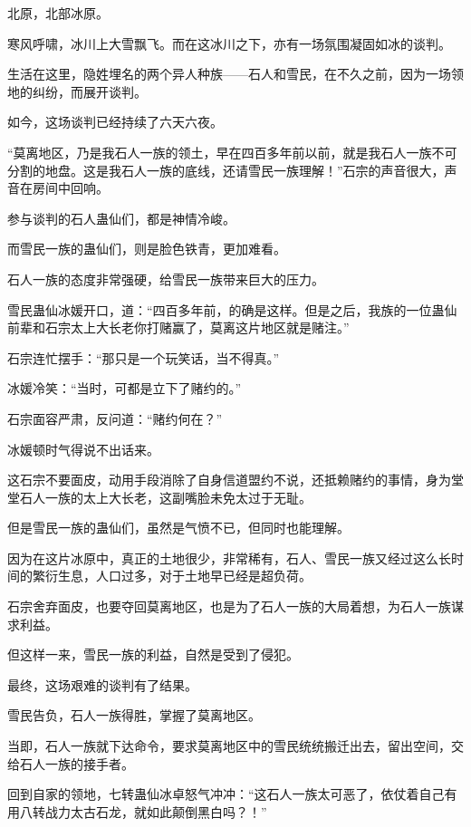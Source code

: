 
\begin{this_body}



北原，北部冰原。

寒风呼啸，冰川上大雪飘飞。而在这冰川之下，亦有一场氛围凝固如冰的谈判。

生活在这里，隐姓埋名的两个异人种族——石人和雪民，在不久之前，因为一场领地的纠纷，而展开谈判。

如今，这场谈判已经持续了六天六夜。

“莫离地区，乃是我石人一族的领土，早在四百多年前以前，就是我石人一族不可分割的地盘。这是我石人一族的底线，还请雪民一族理解！”石宗的声音很大，声音在房间中回响。

参与谈判的石人蛊仙们，都是神情冷峻。

而雪民一族的蛊仙们，则是脸色铁青，更加难看。

石人一族的态度非常强硬，给雪民一族带来巨大的压力。

雪民蛊仙冰媛开口，道：“四百多年前，的确是这样。但是之后，我族的一位蛊仙前辈和石宗太上大长老你打赌赢了，莫离这片地区就是赌注。”

石宗连忙摆手：“那只是一个玩笑话，当不得真。”

冰媛冷笑：“当时，可都是立下了赌约的。”

石宗面容严肃，反问道：“赌约何在？”

冰媛顿时气得说不出话来。

这石宗不要面皮，动用手段消除了自身信道盟约不说，还抵赖赌约的事情，身为堂堂石人一族的太上大长老，这副嘴脸未免太过于无耻。

但是雪民一族的蛊仙们，虽然是气愤不已，但同时也能理解。

因为在这片冰原中，真正的土地很少，非常稀有，石人、雪民一族又经过这么长时间的繁衍生息，人口过多，对于土地早已经是超负荷。

石宗舍弃面皮，也要夺回莫离地区，也是为了石人一族的大局着想，为石人一族谋求利益。

但这样一来，雪民一族的利益，自然是受到了侵犯。

最终，这场艰难的谈判有了结果。

雪民告负，石人一族得胜，掌握了莫离地区。

当即，石人一族就下达命令，要求莫离地区中的雪民统统搬迁出去，留出空间，交给石人一族的接手者。

回到自家的领地，七转蛊仙冰卓怒气冲冲：“这石人一族太可恶了，依仗着自己有用八转战力太古石龙，就如此颠倒黑白吗？！”


\end{this_body}
